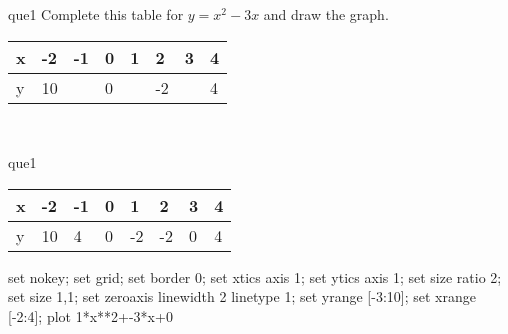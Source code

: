 \documentclass[13.5pt, varwidth=true]{beamer}
\begin{document}
\begin{frame}[shrink=19,fragile]
	\begin{beamercolorbox}[rounded=true, left, shadow=true,wd=14.8cm]{que1}
		 Complete this table for $y = x^{2} - 3x$ and draw the graph. \\[0.3cm] \renewcommand{\arraystretch}{1.2}\begin{tabular}{|C|C|C|C|C|C|C|C|} \hline x & -2 & -1 & 0 & 1 & 2 & 3 & 4 \\ \hline y & 10 &  & 0 &  & -2 &  & 4\\ \hline \end{tabular}\\[0.3cm]
	\end{beamercolorbox}
\end{frame}
\begin{frame}[shrink=19,fragile]
	\begin{beamercolorbox}[rounded=true, left, shadow=true,wd=14.8cm]{que1}
		\renewcommand{\arraystretch}{1.2}\begin{tabular}{|C|C|C|C|C|C|C|C|} \hline x & -2 & -1 & 0 & 1 & 2 & 3 & 4 \\ \hline y & 10 & 4 & 0 & -2 & -2 & 0 & 4\\ \hline \end{tabular}\begin{gnuplot}[terminal=pdf] set nokey; set grid; set border 0; set xtics axis 1; set ytics axis 1; set size ratio 2; set size 1,1; set zeroaxis linewidth 2 linetype 1; set yrange [-3:10]; set xrange [-2:4]; plot 1*x**2+-3*x+0 \end{gnuplot}
	\end{beamercolorbox}
\end{frame}
\end{document}
